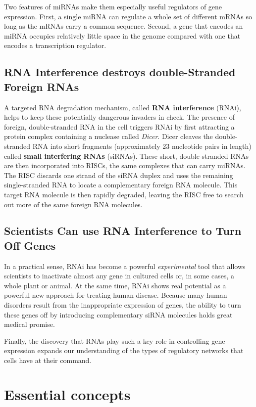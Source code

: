 Two features of miRNAs make them especially useful regulators of gene
expression. First, a single miRNA can regulate a whole set of different
mRNAs so long as the mRNAs carry a common sequence.
Second, a gene that encodes an miRNA occupies relatively little space in
the genome compared with one that encodes a transcription regulator.

\subsection{RNA Interference destroys double-Stranded Foreign RNAs}

A targeted RNA degradation mechanism, called \textbf{RNA interference} (RNAi), helps to keep these
potentially dangerous invaders in check.
The presence of foreign, double-stranded RNA in the cell triggers RNAi by
first attracting a protein complex containing a nuclease called \textit{Dicer}. Dicer
cleaves the double-stranded RNA into short fragments (approximately 23 nucleotide
pairs in length) called \textbf{small interfering RNAs} (siRNAs).
These short, double-stranded RNAs are then incorporated into RISCs, the
same complexes that can carry miRNAs. The RISC discards one strand of
the siRNA duplex and uses the remaining single-stranded RNA to locate
a complementary foreign RNA molecule. This target RNA
molecule is then rapidly degraded, leaving the RISC free to search out
more of the same foreign RNA molecules.

\subsection{Scientists Can use RNA Interference to Turn Off Genes}

In a practical sense, RNAi has become a powerful \textit{experimental} tool that allows scientists to inactivate almost
any gene in cultured cells or, in some cases, a whole plant or animal.
At the same time, RNAi shows real potential as a powerful new approach
for treating human disease. Because many human disorders result from
the inappropriate expression of genes, the ability to turn these genes off
by introducing complementary siRNA molecules holds great medical
promise.

Finally, the discovery that RNAs play such a key role in controlling gene
expression expands our understanding of the types of regulatory networks
that cells have at their command.

\section{Essential concepts}

